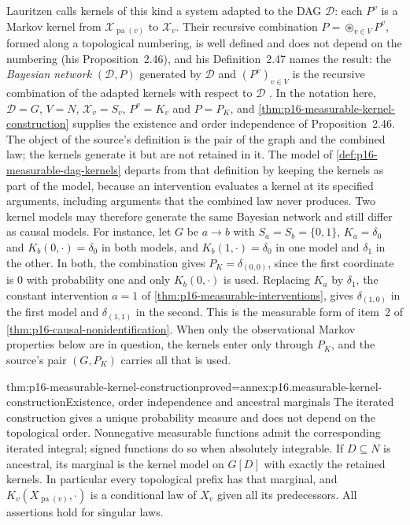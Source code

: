 Lauritzen calls kernels of this kind a system adapted to the DAG
\(\mathcal D\): each \(P^v\) is a Markov kernel from
\(\mathcal X_{\operatorname{pa}(v)}\) to \(\mathcal X_v\). Their recursive
combination \(P=\circledast_{v\in V}P^v\), formed along a topological
numbering, is well defined and does not depend on the numbering (his
Proposition~2.46), and his Definition~2.47 names the result: the
\emph{Bayesian network} \((\mathcal D,P)\) generated by \(\mathcal D\)
and \((P^v)_{v\in V}\) is the recursive combination of the adapted
kernels with respect to \(\mathcal D\)
\cite[Proposition~2.46 and Definition~2.47, p.~66]{Lauritzen2019GraphicalLectures2020}.
In the notation here, \(\mathcal D=G\), \(V=N\),
\(\mathcal X_v=S_v\), \(P^v=K_v\) and \(P=P_K\), and
\cref{thm:p16-measurable-kernel-construction} supplies the existence and
order independence of Proposition~2.46. The object of the source's
definition is the pair of the graph and the combined law; the kernels
generate it but are not retained in it. The model of
\cref{def:p16-measurable-dag-kernels} departs from that definition by
keeping the kernels as part of the model, because an intervention
evaluates a kernel at its specified arguments, including arguments that
the combined law never produces. Two kernel models may therefore generate
the same Bayesian network and still differ as causal models. For
instance, let \(G\) be \(a\to b\) with \(S_a=S_b=\{0,1\}\),
\(K_a=\delta_0\) and \(K_b(0,\cdot)=\delta_0\) in both models, and
\(K_b(1,\cdot)=\delta_0\) in one model and \(\delta_1\) in the other.
In both, the combination gives \(P_K=\delta_{(0,0)}\), since the first
coordinate is \(0\) with probability one and only \(K_b(0,\cdot)\) is
used. Replacing \(K_a\) by \(\delta_1\), the constant intervention
\(a=1\) of \cref{thm:p16-measurable-interventions}, gives
\(\delta_{(1,0)}\) in the first model and \(\delta_{(1,1)}\) in the
second. This is the measurable form of item~2 of
\cref{thm:p16-causal-nonidentification}. When only the observational
Markov properties below are in question, the kernels enter only through
\(P_K\), and the source's pair \((G,P_K)\) carries all that is used.

\begin{hbtheorem}{thm:p16-measurable-kernel-construction}{proved=annex:p16.measurable-kernel-construction}{Existence, order independence and ancestral marginals}
The iterated construction gives a unique probability measure and does not
depend on the topological order. Nonnegative measurable functions admit
the corresponding iterated integral; signed functions do so when absolutely
integrable. If \(D\subseteq N\) is ancestral, its marginal is the kernel
model on \(G[D]\) with exactly the retained kernels. In particular every
topological prefix has that marginal, and
\(K_v(X_{\operatorname{pa}(v)},\cdot)\) is a conditional law of \(X_v\)
given all its predecessors. All assertions hold for singular laws.
\end{hbtheorem}

